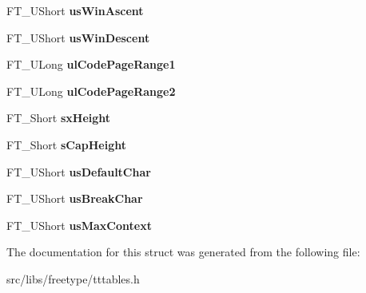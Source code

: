 \begin{DoxyCompactItemize}
\item 
\hypertarget{struct_t_t___o_s2___aeb85b76e77753e4b59945550bdd098a1}{
FT\_\-UShort {\bfseries usWinAscent}}
\label{struct_t_t___o_s2___aeb85b76e77753e4b59945550bdd098a1}

\item 
\hypertarget{struct_t_t___o_s2___a573ace3da03efa98a716a8443e4d0084}{
FT\_\-UShort {\bfseries usWinDescent}}
\label{struct_t_t___o_s2___a573ace3da03efa98a716a8443e4d0084}

\item 
\hypertarget{struct_t_t___o_s2___a0b5a2875c21d20e5a5b5f3641ddb29fc}{
FT\_\-ULong {\bfseries ulCodePageRange1}}
\label{struct_t_t___o_s2___a0b5a2875c21d20e5a5b5f3641ddb29fc}

\item 
\hypertarget{struct_t_t___o_s2___ad117c64d73d15d1304c75fb5f41f1124}{
FT\_\-ULong {\bfseries ulCodePageRange2}}
\label{struct_t_t___o_s2___ad117c64d73d15d1304c75fb5f41f1124}

\item 
\hypertarget{struct_t_t___o_s2___a2eb3bb1392461a536c393304bde72835}{
FT\_\-Short {\bfseries sxHeight}}
\label{struct_t_t___o_s2___a2eb3bb1392461a536c393304bde72835}

\item 
\hypertarget{struct_t_t___o_s2___ac755913b648d535d1207927e4a6f1ec0}{
FT\_\-Short {\bfseries sCapHeight}}
\label{struct_t_t___o_s2___ac755913b648d535d1207927e4a6f1ec0}

\item 
\hypertarget{struct_t_t___o_s2___af8639fefeb705a9287df996b224462ea}{
FT\_\-UShort {\bfseries usDefaultChar}}
\label{struct_t_t___o_s2___af8639fefeb705a9287df996b224462ea}

\item 
\hypertarget{struct_t_t___o_s2___a1d47030e246d2593ec3e4cdf66b17161}{
FT\_\-UShort {\bfseries usBreakChar}}
\label{struct_t_t___o_s2___a1d47030e246d2593ec3e4cdf66b17161}

\item 
\hypertarget{struct_t_t___o_s2___a167313e407c77db2c4ca5a987f3a1482}{
FT\_\-UShort {\bfseries usMaxContext}}
\label{struct_t_t___o_s2___a167313e407c77db2c4ca5a987f3a1482}

\end{DoxyCompactItemize}


The documentation for this struct was generated from the following file:\begin{DoxyCompactItemize}
\item 
src/libs/freetype/tttables.h\end{DoxyCompactItemize}
